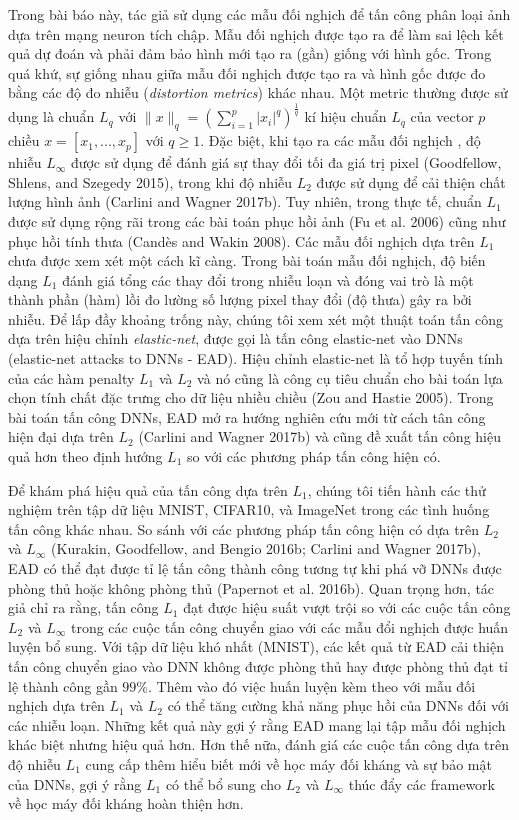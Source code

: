 Trong bài báo này, tác giả sử dụng các mẫu đối nghịch để tấn công phân loại ảnh dựa trên 
mạng neuron tích chập. Mẫu đối nghịch được tạo ra để làm sai lệch kết quả dự đoán và phải đảm bảo
hình mới tạo ra (gần) giống với hình gốc. Trong quá khứ, sự giống nhau giữa mẫu đối nghịch được tạo
ra và hình gốc được đo bằng các độ đo nhiễu (\textit{distortion metrics}) khác nhau.
Một metric thường được sử dụng là chuẩn $L_q$ 
với $\lVert x \rVert_q = \left( \sum_{i=1}^p |x_i|^q \right)^{\frac{1}{q}}$ kí hiệu chuẩn $L_q$
của vector $p$ chiều $x = [x_1, ..., x_p]$ với $q \geq 1$. Đặc biệt, khi tạo ra các mẫu đối nghịch
, độ nhiễu $L_{\infty}$ được sử dụng để đánh giá sự thay đổi tối đa giá trị pixel (Goodfellow, 
Shlens, and Szegedy 2015), trong khi độ nhiễu $L_2$ được sử dụng để cải thiện chất lượng hình 
ảnh (Carlini and Wagner 2017b). Tuy nhiên, trong thực tế, chuẩn $L_1$ được sử dụng rộng rãi 
trong các bài toán phục hồi ảnh (Fu et al. 2006) cũng như phục hồi tính thưa (Candès and Wakin 2008).
Các mẫu đối nghịch dựa trên $L_1$ chưa được xem xét một cách kĩ càng. Trong bài toán mẫu đối nghịch,
độ biến dạng $L_1$ đánh giá tổng các thay đổi trong nhiễu loạn và đóng vai trò là một thành phần
(hàm) lồi đo lường số lượng pixel thay đổi (độ thưa) gây ra bởi nhiễu. Để lấp đầy khoảng trống
này, chúng tôi xem xét một thuật toán tấn công dựa trên hiệu chỉnh \textit{elastic-net}, được 
gọi là tấn công elastic-net vào DNNs (elastic-net attacks to DNNs - EAD). Hiệu chỉnh 
elastic-net là tổ hợp tuyến tính của các hàm penalty $L_1$ và $L_2$ và nó cũng là công cụ 
tiêu chuẩn cho bài toán lựa chọn tính chất đặc trưng cho dữ liệu nhiều chiều (Zou and Hastie 2005). 
Trong bài toán tấn công DNNs, EAD mở ra hướng nghiên cứu mới từ cách tân công hiện đại dựa trên 
$L_2$ (Carlini and Wagner 2017b) và cũng đề xuất tấn công hiệu quả hơn theo định hướng $L_1$
so với các phương pháp tấn công hiện có. 

Để khám phá hiệu quả của tấn công dựa trên $L_1$, chúng tôi tiến hành các thử nghiệm trên tập 
dữ liệu MNIST, CIFAR10, và ImageNet trong các tình huống tấn công khác nhau. So sánh với các 
phương pháp tấn công hiện có dựa trên $L_2$ và $L_{\infty}$ (Kurakin, Goodfellow, and 
Bengio 2016b; Carlini and Wagner 2017b), EAD có thể đạt được tỉ lệ tấn công thành công tương 
tự khi phá vỡ DNNs được phòng thủ hoặc không phòng thủ (Papernot et al. 2016b). Quan trọng 
hơn, tác giả chỉ ra rằng, tấn công $L_1$ đạt được hiệu suất vượt trội so với các cuộc tấn
công $L_2$ và $L_{\infty}$ trong các cuộc tấn công chuyển giao với các mẫu đổi nghịch được huấn
luyện bổ sung. Với tập dữ liệu khó nhất (MNIST), các kết quả từ EAD cải thiện tấn công chuyển 
giao vào DNN không được phòng thủ hay được phòng thủ đạt tỉ lệ thành công gần $99\%$. Thêm vào 
đó việc huấn luyện kèm theo với mẫu đối nghịch dựa trên $L_1$ và $L_2$ có thể tăng cường khả 
năng phục hồi của DNNs đối với các nhiễu loạn. Những kết quả này gợi ý rằng EAD mang lại tập 
mẫu đối nghịch khác biệt nhưng hiệu quả hơn. Hơn thế nữa, đánh giá các cuộc tấn công dựa trên 
độ nhiễu $L_1$ cung cấp thêm hiểu biết mới về học máy đối kháng và sự bảo mật của DNNs, gợi 
ý rằng $L_1$ có thể bổ sung cho $L_2$ và $L_{\infty}$ thúc đẩy các framework về học máy đối 
kháng hoàn thiện hơn.
